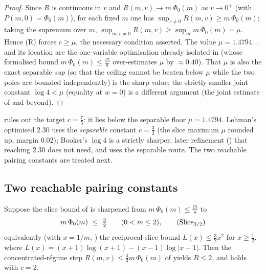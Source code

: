 \begin{proof}
Since $R$ is continuous in $v$ and $R(m,v)\to m\,\Phi_0(m)$ as $v\to0^+$ (with
$P(m,0)=\Phi_0(m)$), for each fixed $m$ one has
$\sup_{v\neq0}R(m,v)\ge m\,\Phi_0(m)$; taking the supremum over $m$,
$\sup_{m,v\neq0}R(m,v)\ge\sup_m m\,\Phi_0(m)=\mu$. Hence \textup{(R)} forces
$c\ge\mu$, the necessary condition asserted. The value $\mu=1.4794\ldots$
and its location are the one-variable optimisation already isolated in
 (whose formalised bound $m\,\Phi_0(m)\le\tfrac{15}8$
over-estimates $\mu$ by $\approx0.40$). That $\mu$ is also the exact separable
\emph{sup} (so that the ceiling cannot be beaten below $\mu$ while the two poles are
bounded independently) is the sharp value; the strictly smaller joint constant
$\log4<\mu$ (equality at $w=0$) is a different argument (the joint estimate of
 and beyond).
\end{proof}

\begin{remark}[The target $c=\tfrac75$]
 rules out the target $c=\tfrac75$: it lies below the separable
floor $\mu=1.4794$. Lehman's optimised $2.30$ uses the \emph{separable} constant
$c=\tfrac32$ (the slice maximum $\mu$ rounded up, margin $0.02$); Booker's $\log4$ is
a strictly sharper, later refinement (\cite{TrudgianTuring}) that reaching $2.30$
does not need, and  uses the separable route. The two reachable
pairing constants are treated next.
\end{remark}

\subsection{Two reachable pairing constants}

\begin{lemma}[$c=2$ by a one-variable slice sharpening]
\label{lem:ls_rung_two}
\leanok
{}
Suppose the slice bound of  is sharpened from
$m\,\Phi_0(m)\le\tfrac{15}8$ to
\begin{equation}
  m\,\Phi_0(m)\ \le\ \tfrac32
  \qquad(0<m\le 2),
  \tag{Slice$_{3/2}$}
  \label{eq:ls_slice}
\end{equation}
equivalently (with $x=1/m$, ) the reciprocal-slice bound
$L(x)\le\tfrac32 x^2$ for $x\ge\tfrac12$, where
$L(x)=(x+1)\log(x+1)-(x-1)\log|x-1|$. Then the concentrated-régime step
$R(m,v)\le\tfrac43 m\,\Phi_0(m)$ of  yields $R\le2$, and
 holds with $c=2$.
\end{lemma}

